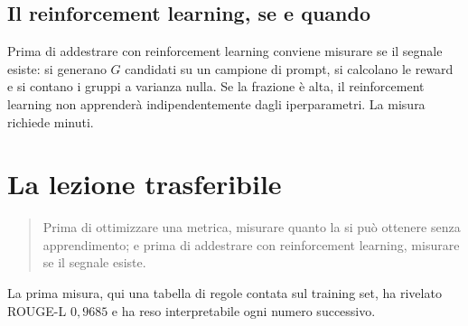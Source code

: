 \subsection{Il reinforcement learning, se e quando}

Prima di addestrare con reinforcement learning conviene misurare se il segnale
esiste: si generano $G$ candidati su un campione di prompt, si calcolano le
reward e si contano i gruppi a varianza nulla. Se la frazione è alta, il
reinforcement learning non apprenderà indipendentemente dagli iperparametri. La
misura richiede minuti.

\section{La lezione trasferibile}

\begin{quote}
Prima di ottimizzare una metrica, misurare quanto la si può ottenere senza
apprendimento; e prima di addestrare con reinforcement learning, misurare se il
segnale esiste.
\end{quote}

La prima misura, qui una tabella di regole contata sul training set, ha rivelato
ROUGE-L $0{,}9685$ e ha reso interpretabile ogni numero successivo.
